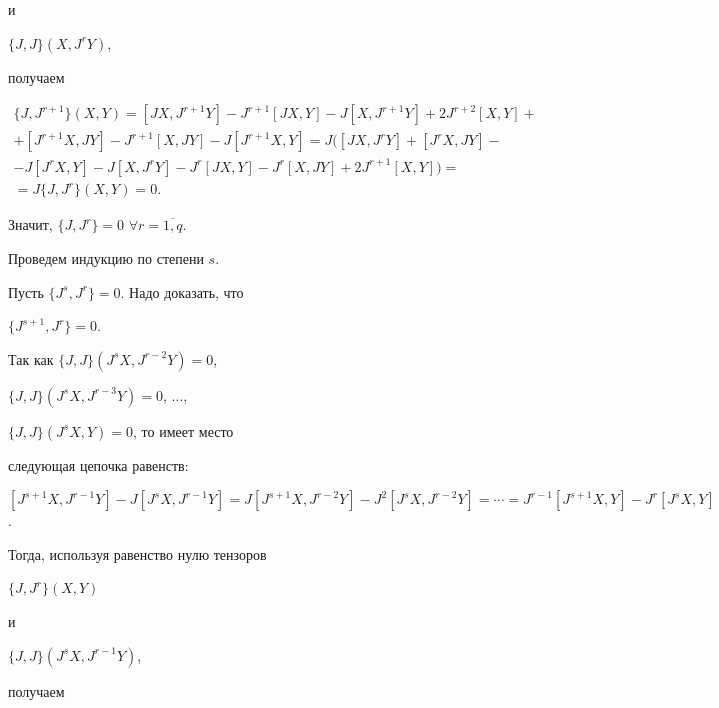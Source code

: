 и


$\{ J,J \}(X,J^{r}Y)$,


получаем


\begin{gather*}


\{ J,J^{r+1} \}(X,Y) = [JX,J^{r+1} Y] - J^{r+1}[JX,Y] -


J[X,J^{r+1} Y] + 2 J^{r+2}[X,Y] +\\


%


+ [J^{r+1}X,JY] -


J^{r+1}[X,JY] - J[J^{r+1}X,Y] = J([JX,J^{r}Y] + [J^{r}X,JY]-\\


%


- J[J^{r}X,Y] - J[X,J^{r}Y] - J^{r}[JX,Y] - J^{r}[X,JY] +2J^{r+1}[X,Y]) =\\


%


= J\{ J,J^{r}\}(X,Y) = 0.


\end{gather*}


Значит, $\{ J,J^{r}\} = 0$ $  \forall r=\overline{1,q}$.





Проведем индукцию по степени $s$.


Пусть $\{ J^{s},J^{r}\} = 0$. Надо доказать, что


$\{ J^{s+1},J^{r}\}=0 $.


Так как $\{ J,J\}(J^{s}X,J^{r-2}Y)=0$,


$\{ J,J\}(J^{s}X,J^{r-3}Y)=0$,  $\dotsc$,


$\{ J,J\}(J^{s}X,Y)=0$, то имеет место


следующая цепочка равенств:


$[J^{s+1}X,J^{r-1}Y] - J[J^{s}X,J^{r-1}Y] =


J[J^{s+1}X,J^{r-2}Y] - J^2[J^{s}X,J^{r-2}Y] =


\dotsb =


J^{r-1}[J^{s+1}X,Y] - J^{r}[J^{s}X,Y]$.


Тогда, используя равенство нулю тензоров


$\{ J,J^{r}\}(X,Y)$


и


$\{ J,J\}(J^{s}X,J^{r-1}Y)$,


получаем


